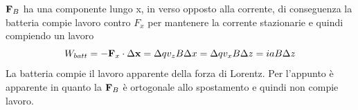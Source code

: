 $\bold{F}_{B}$ ha una componente lungo x, in verso opposto alla corrente, di conseguenza la batteria compie lavoro contro $F_x$ per mantenere la corrente stazionarie e quindi compiendo un lavoro
\begin{equation*}
	W_{batt} = -\bold{F}_x \cdot \Delta \bold{x} = \Delta q v_{z}B \Delta x = \Delta q v_{x} B \Delta z = iaB \Delta z
\end{equation*}
La batteria compie il lavoro apparente della forza di Lorentz. Per l'appunto \`e apparente in quanto la $\bold{F}_{B}$ \`e ortogonale allo spostamento e quindi non compie lavoro.

















